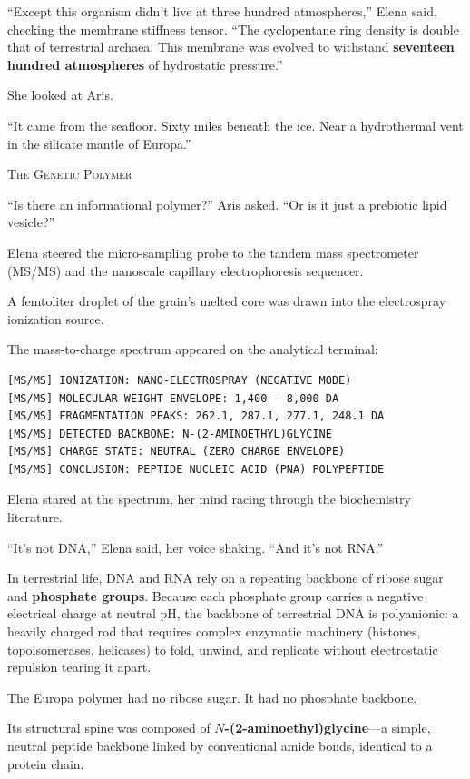 \documentclass[12pt,twoside,openright]{book}
\newcommand{\sceneheader}[1]{%
  \par\vspace{1.8em}%
  {\noindent\centering\scshape\large #1\par}%
  \vspace{1.0em}%
  \noindent%
}
\newcommand{\dinkus}{%
  \par\vspace{1.2em}%
  {\noindent\centering{\large $\ast\quad\ast\quad\ast$}\par}%
  \vspace{1.2em}%
  \noindent%
}
\begin{document}
``Except this organism didn't live at three hundred atmospheres,'' Elena
said, checking the membrane stiffness tensor. ``The cyclopentane ring
density is double that of terrestrial archaea. This membrane was evolved
to withstand \textbf{seventeen hundred atmospheres} of hydrostatic
pressure.''

She looked at Aris.

``It came from the seafloor. Sixty miles beneath the ice. Near a
hydrothermal vent in the silicate mantle of Europa.''

\dinkus

\sceneheader{The Genetic Polymer}

``Is there an informational polymer?'' Aris asked. ``Or is it just a
prebiotic lipid vesicle?''

Elena steered the micro-sampling probe to the tandem mass spectrometer
(MS/MS) and the nanoscale capillary electrophoresis sequencer.

A femtoliter droplet of the grain's melted core was drawn into the
electrospray ionization source.

The mass-to-charge spectrum appeared on the analytical terminal:

\begin{lstlisting}
[MS/MS] IONIZATION: NANO-ELECTROSPRAY (NEGATIVE MODE)
[MS/MS] MOLECULAR WEIGHT ENVELOPE: 1,400 - 8,000 DA
[MS/MS] FRAGMENTATION PEAKS: 262.1, 287.1, 277.1, 248.1 DA
[MS/MS] DETECTED BACKBONE: N-(2-AMINOETHYL)GLYCINE
[MS/MS] CHARGE STATE: NEUTRAL (ZERO CHARGE ENVELOPE)
[MS/MS] CONCLUSION: PEPTIDE NUCLEIC ACID (PNA) POLYPEPTIDE
\end{lstlisting}

Elena stared at the spectrum, her mind racing through the biochemistry
literature.

``It's not DNA,'' Elena said, her voice shaking. ``And it's not RNA.''

In terrestrial life, DNA and RNA rely on a repeating backbone of ribose
sugar and \textbf{phosphate groups}. Because each phosphate group
carries a negative electrical charge at neutral pH, the backbone of
terrestrial DNA is polyanionic: a heavily charged rod that requires
complex enzymatic machinery (histones, topoisomerases, helicases) to
fold, unwind, and replicate without electrostatic repulsion tearing it
apart.

The Europa polymer had no ribose sugar. It had no phosphate backbone.

Its structural spine was composed of
\textbf{\(N\)-(2-aminoethyl)glycine}---a simple, neutral peptide
backbone linked by conventional amide bonds, identical to a protein
chain.
\end{document}
